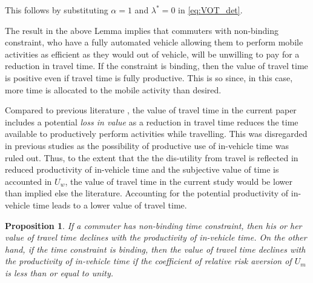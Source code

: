 \documentclass[12pt,a4paper,british]{article}
\makeatletter
\newenvironment{proof}[1][\proofname]{\par
    \normalfont\topsep6\p@\@plus6\p@\relax
    \trivlist
    \itemindent\parindent
    \item[\hskip\labelsep
          \scshape
      #1]\ignorespaces
  }{%
    \endtrivlist\@endpefalse
  }
\providecommand{\proofname}{Proof}
\newtheorem{prop}{Proposition}[section]
\makeatother
\begin{document}
\begin{proof}
	This follows by substituting $\alpha=1$ and $\lambda^{\ast}=0$ in \eqref{eq:VOT_det}.
\end{proof}

The result in the above Lemma implies that commuters with non-binding constraint, who have a fully automated vehicle allowing them to perform mobile activities as efficient as they would out of vehicle, will be unwilling to pay for a reduction in travel time. If the constraint is binding, then the value of travel time is positive even if travel time is fully productive. This is so since, in this case, more time is allocated to the mobile activity than desired. 


Compared to previous literature \citep[e.g. ][]{Johnson1966TravelTimePrice,Oort1969EvaluationTravellingTime}, the value of travel time in the current paper includes a potential \textit{loss in value} as a reduction in travel time reduces the time available to productively perform activities while travelling. This was disregarded in previous studies as the possibility of productive use of in-vehicle time was ruled out. Thus, to the extent that the the dis-utility from travel is reflected in reduced productivity of in-vehicle time and the subjective value of time is accounted in $U_w$, the value of travel time in the current study would be lower than implied else the literature. Accounting for the potential productivity of in-vehicle time leads to a lower value of travel time.


\begin{prop}
If a commuter has non-binding time constraint, then his or her value of travel time declines with the productivity of in-vehicle time. On the other hand, if the time constraint is binding, then the value of travel time declines with the productivity of in-vehicle time if the coefficient of relative risk aversion of $U_m$ is less than or equal to unity.
\end{prop}
\end{document}
